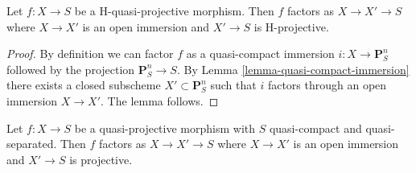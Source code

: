 \begin{lemma}
\label{lemma-H-quasi-projective-open-H-projective}
Let $f : X \to S$ be a H-quasi-projective morphism.
Then $f$ factors as $X \to X' \to S$ where $X \to X'$ is an
open immersion and $X' \to S$ is H-projective.
\end{lemma}

\begin{proof}
By definition we can factor $f$ as a quasi-compact immersion
$i : X \to \mathbf{P}^n_S$ followed by the projection $\mathbf{P}^n_S \to S$.
By Lemma \ref{lemma-quasi-compact-immersion} there exists a closed
subscheme $X' \subset \mathbf{P}^n_S$ such that $i$ factors through
an open immersion $X \to X'$. The lemma follows.
\end{proof}

\begin{lemma}
\label{lemma-quasi-projective-open-projective}
Let $f : X \to S$ be a quasi-projective morphism with $S$ quasi-compact
and quasi-separated. Then $f$ factors as $X \to X' \to S$ where $X \to X'$
is an open immersion and $X' \to S$ is projective.
\end{lemma}

